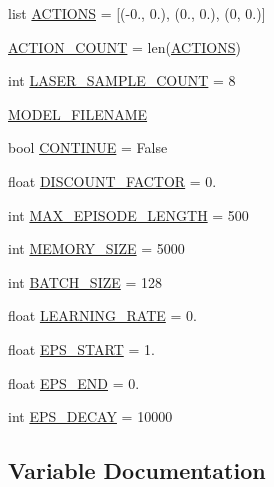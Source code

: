 \begin{DoxyCompactItemize}
\item 
list \hyperlink{namespaceparameters__q__learning_a66c8c40f5320c99b1f1c3ed1fdd758e1}{A\+C\+T\+I\+O\+NS} = \mbox{[}(-\/0., 0.), (0., 0.), (0, 0.)\mbox{]}
\item 
\hyperlink{namespaceparameters__q__learning_a5342e6c6e46b1e1fe5004c3988bc5dd2}{A\+C\+T\+I\+O\+N\+\_\+\+C\+O\+U\+NT} = len(\hyperlink{namespaceparameters__q__learning_a66c8c40f5320c99b1f1c3ed1fdd758e1}{A\+C\+T\+I\+O\+NS})
\item 
int \hyperlink{namespaceparameters__q__learning_a4de51256939283562cde82f70bdfa0e9}{L\+A\+S\+E\+R\+\_\+\+S\+A\+M\+P\+L\+E\+\_\+\+C\+O\+U\+NT} = 8
\item 
\hyperlink{namespaceparameters__q__learning_ae9a9619d0b3871b2198c290d3c1d413c}{M\+O\+D\+E\+L\+\_\+\+F\+I\+L\+E\+N\+A\+ME}
\item 
bool \hyperlink{namespaceparameters__q__learning_ac741bfed56fe758fadff980029dfcceb}{C\+O\+N\+T\+I\+N\+UE} = False
\item 
float \hyperlink{namespaceparameters__q__learning_a88e249f3a5dd9dc91a27b3cdfe532973}{D\+I\+S\+C\+O\+U\+N\+T\+\_\+\+F\+A\+C\+T\+OR} = 0.
\item 
int \hyperlink{namespaceparameters__q__learning_a03ff8ce2ce05d074f13d67465b1aec22}{M\+A\+X\+\_\+\+E\+P\+I\+S\+O\+D\+E\+\_\+\+L\+E\+N\+G\+TH} = 500
\item 
int \hyperlink{namespaceparameters__q__learning_a10c41374c2df3aba0e4ae7ca509fc58c}{M\+E\+M\+O\+R\+Y\+\_\+\+S\+I\+ZE} = 5000
\item 
int \hyperlink{namespaceparameters__q__learning_a5691eccf1d7dfa8b1192765cfab78da2}{B\+A\+T\+C\+H\+\_\+\+S\+I\+ZE} = 128
\item 
float \hyperlink{namespaceparameters__q__learning_a88aea3d4050f21826e2d2c5f977df6df}{L\+E\+A\+R\+N\+I\+N\+G\+\_\+\+R\+A\+TE} = 0.
\item 
float \hyperlink{namespaceparameters__q__learning_a21d09414cb2520640df5d394bd9c20d2}{E\+P\+S\+\_\+\+S\+T\+A\+RT} = 1.
\item 
float \hyperlink{namespaceparameters__q__learning_a0d3bb6a1d066977ff1d2df878f18db11}{E\+P\+S\+\_\+\+E\+ND} = 0.
\item 
int \hyperlink{namespaceparameters__q__learning_af2f2d3bbf9c18d7c42d5ade6462bb2ba}{E\+P\+S\+\_\+\+D\+E\+C\+AY} = 10000
\end{DoxyCompactItemize}


\subsection{Variable Documentation}
